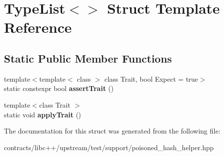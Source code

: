 \hypertarget{struct_type_list_3_4}{}\section{Type\+List$<$$>$ Struct Template Reference}
\label{struct_type_list_3_4}
\subsection*{Static Public Member Functions}
\begin{DoxyCompactItemize}
\item 
\mbox{\label{struct_type_list_3_4_af212d0e10b42b99ea2a10f8f9b3c028e}} 
{\footnotesize template$<$template$<$ class $>$ class Trait, bool Expect = true$>$ }\\static constexpr bool {\bfseries assert\+Trait} ()
\item 
\mbox{\label{struct_type_list_3_4_a6eb3c6301960220c4e24a193b41bfa48}} 
{\footnotesize template$<$class Trait $>$ }\\static void {\bfseries apply\+Trait} ()
\end{DoxyCompactItemize}


The documentation for this struct was generated from the following file\+:\begin{DoxyCompactItemize}
\item 
contracts/libc++/upstream/test/support/poisoned\+\_\+hash\+\_\+helper.\+hpp\end{DoxyCompactItemize}
